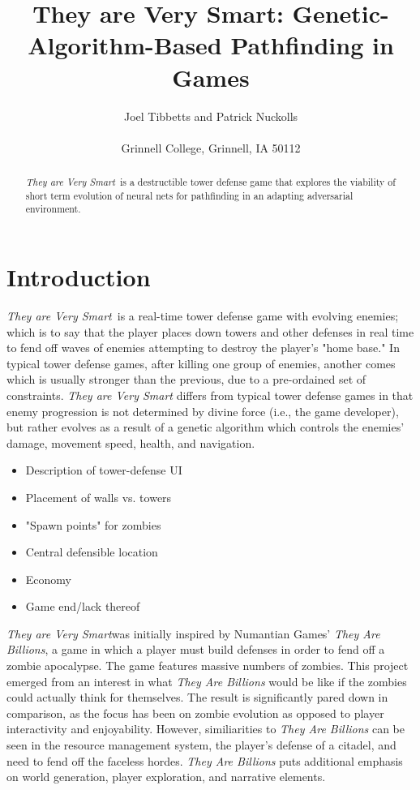 \documentclass[letterpaper]{article}
\title{They are Very Smart: Genetic-Algorithm-Based Pathfinding in Games}
\author{Joel Tibbetts and Patrick Nuckolls\\
\mbox{}\\
Grinnell College, Grinnell, IA 50112 \\
} %
\def\tavs{\textit{They are Very Smart}}
\begin{document}
\maketitle

\begin{abstract}
 \tavs~is a destructible tower defense game that explores the viability of short term evolution of neural nets for pathfinding in an adapting adversarial environment.
\end{abstract}

\section{Introduction}
\tavs~is a real-time tower defense game with evolving enemies; which is to say that the player places down towers and other defenses in real time to fend off waves of enemies attempting to destroy the player's "home base." In typical tower defense games, after killing one group of enemies, another comes which is usually stronger than the previous, due to a pre-ordained set of constraints. \textit{They are Very Smart} differs from typical tower defense games in that enemy progression is not determined by divine force (i.e., the game developer), but rather evolves as a result of a genetic algorithm which controls the enemies' damage, movement speed, health, and navigation.

\begin{itemize}
    \item Description of tower-defense UI
    \item Placement of walls vs. towers
    \item "Spawn points" for zombies
    \item Central defensible location
    \item Economy
    \item Game end/lack thereof
\end{itemize}


\tavs was initially inspired by Numantian Games' \textit{They Are Billions}, a game in which a player must build defenses in order to fend off a zombie apocalypse. The game features massive numbers of zombies. This project emerged from an interest in what \textit{They Are Billions} would be like if the zombies could actually think for themselves. The result is significantly pared down in comparison, as the focus has been on zombie evolution as opposed to player interactivity and enjoyability. However, similiarities to \textit{They Are Billions} can be seen in the resource management system, the player's defense of a citadel, and need to fend off the faceless hordes. \textit{They Are Billions} puts additional emphasis on world generation, player exploration, and narrative elements.
\end{document}
